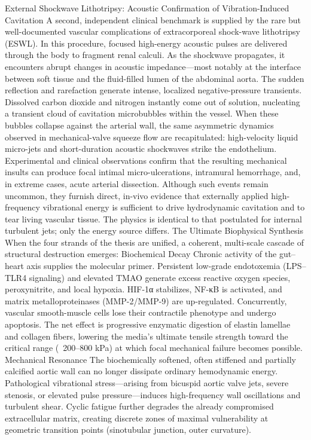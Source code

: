 External Shockwave Lithotripsy: Acoustic Confirmation of Vibration-Induced Cavitation
A second, independent clinical benchmark is supplied by the rare but well-documented vascular complications of extracorporeal shock-wave lithotripsy (ESWL). In this procedure, focused high-energy acoustic pulses are delivered through the body to fragment renal calculi. As the shockwave propagates, it encounters abrupt changes in acoustic impedance—most notably at the interface between soft tissue and the fluid-filled lumen of the abdominal aorta. The sudden reflection and rarefaction generate intense, localized negative-pressure transients. Dissolved carbon dioxide and nitrogen instantly come out of solution, nucleating a transient cloud of cavitation microbubbles within the vessel.
When these bubbles collapse against the arterial wall, the same asymmetric dynamics observed in mechanical-valve squeeze flow are recapitulated: high-velocity liquid micro-jets and short-duration acoustic shockwaves strike the endothelium. Experimental and clinical observations confirm that the resulting mechanical insults can produce focal intimal micro-ulcerations, intramural hemorrhage, and, in extreme cases, acute arterial dissection. Although such events remain uncommon, they furnish direct, in-vivo evidence that externally applied high-frequency vibrational energy is sufficient to drive hydrodynamic cavitation and to tear living vascular tissue. The physics is identical to that postulated for internal turbulent jets; only the energy source differs.
The Ultimate Biophysical Synthesis
When the four strands of the thesis are unified, a coherent, multi-scale cascade of structural destruction emerges:
Biochemical Decay
Chronic activity of the gut–heart axis supplies the molecular primer. Persistent low-grade endotoxemia (LPS–TLR4 signaling) and elevated TMAO generate excess reactive oxygen species, peroxynitrite, and local hypoxia. HIF-1α stabilizes, NF-κB is activated, and matrix metalloproteinases (MMP-2/MMP-9) are up-regulated. Concurrently, vascular smooth-muscle cells lose their contractile phenotype and undergo apoptosis. The net effect is progressive enzymatic digestion of elastin lamellae and collagen fibers, lowering the media’s ultimate tensile strength toward the critical range (~200–800 kPa) at which focal mechanical failure becomes possible.
Mechanical Resonance
The biochemically softened, often stiffened and partially calcified aortic wall can no longer dissipate ordinary hemodynamic energy. Pathological vibrational stress—arising from bicuspid aortic valve jets, severe stenosis, or elevated pulse pressure—induces high-frequency wall oscillations and turbulent shear. Cyclic fatigue further degrades the already compromised extracellular matrix, creating discrete zones of maximal vulnerability at geometric transition points (sinotubular junction, outer curvature).
